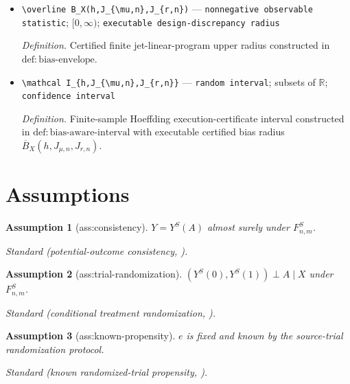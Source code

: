 \documentclass{article}
\newtheorem{assumption}{Assumption}
\begin{document}
\begin{itemize}
  \item \texttt{\textbackslash{}\allowbreak{}overline B\_\allowbreak{}X(h,\allowbreak{}J\_\allowbreak{}\{\textbackslash{}\allowbreak{}mu,\allowbreak{}n\}\allowbreak{},\allowbreak{}J\_\allowbreak{}\{r,\allowbreak{}n\}\allowbreak{})} --- \texttt{nonnegative observable statistic}; \([0,\infty)\); \texttt{executable design-\allowbreak{}discrepancy radius}
  \par\smallskip\noindent\emph{Definition.} Certified finite jet-linear-program upper radius constructed in \(\mathrm{def:bias\text{-}envelope}\).
  \item \texttt{\textbackslash{}\allowbreak{}mathcal I\_\allowbreak{}\{h,\allowbreak{}J\_\allowbreak{}\{\textbackslash{}\allowbreak{}mu,\allowbreak{}n\}\allowbreak{},\allowbreak{}J\_\allowbreak{}\{r,\allowbreak{}n\}\allowbreak{}\}\allowbreak{}} --- \texttt{random interval}; subsets of \(\mathbb R\); \texttt{confidence interval}
  \par\smallskip\noindent\emph{Definition.} Finite-sample Hoeffding execution-certificate interval constructed in \(\mathrm{def:bias\text{-}aware\text{-}interval}\) with executable certified bias radius \(\overline B_X(h,J_{\mu,n},J_{r,n})\).
\end{itemize}

\section{Assumptions}

\begin{assumption}[ass:consistency]\label{ass:consistency}
\(Y=Y^S(A)\) almost surely under \(F^S_{n,m}\).
\par\smallskip\noindent\emph{Standard} (potential-outcome consistency, \cite{DahabrehRobertsonStuartEtAl2020}).
\end{assumption}

\begin{assumption}[ass:trial-randomization]\label{ass:trial-randomization}
\((Y^S(0),Y^S(1))\perp A\mid X\) under \(F^S_{n,m}\).
\par\smallskip\noindent\emph{Standard} (conditional treatment randomization, \cite{DahabrehRobertsonStuartEtAl2020}).
\end{assumption}

\begin{assumption}[ass:known-propensity]\label{ass:known-propensity}
\(e\) is fixed and known by the source-trial randomization protocol.
\par\smallskip\noindent\emph{Standard} (known randomized-trial propensity, \cite{BurmanGamaloGhosalKundu2026}).
\end{assumption}
\end{document}
